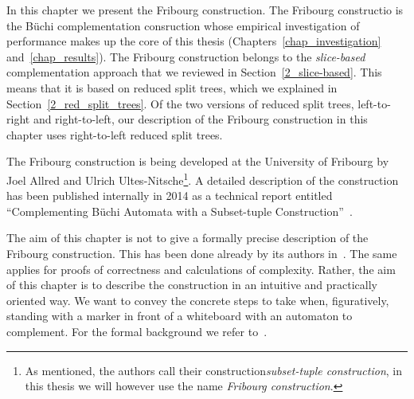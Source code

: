 In this chapter we present the Fribourg construction. The Fribourg constructio  is the Büchi complementation consruction whose empirical investigation of performance makes up the core of this thesis (Chapters~\ref{chap_investigation} and~\ref{chap_results}). The Fribourg construction belongs to the \textit{slice-based} complementation approach that we reviewed in Section~\ref{2_slice-based}. This means that it is based on reduced split trees, which we explained in Section~\ref{2_red_split_trees}. Of the two versions of reduced split trees, left-to-right and right-to-left, our description of the Fribourg construction in this chapter uses right-to-left reduced split trees.

The Fribourg construction is being developed at the University of Fribourg by Joel Allred and Ulrich Ultes-Nitsche\footnote{As mentioned, the authors call their construction\textit{subset-tuple construction}, in this thesis we will however use the name \textit{Fribourg construction}.}. A detailed description of the construction has been published internally in 2014 as a technical report entitled ``Complementing Büchi Automata with a Subset-tuple Construction''~\cite{2014_joel_ulrich}.

The aim of this chapter is not to give a formally precise description of the Fribourg construction. This has been done already by its authors in~\cite{2014_joel_ulrich}. The same applies for proofs of correctness and calculations of complexity. Rather, the aim of this chapter is to describe the construction in an intuitive and practically oriented way. We want to convey the concrete steps to take when, figuratively, standing with a marker in front of a whiteboard with an automaton to complement. For the formal background we refer to~\cite{2014_joel_ulrich}.







